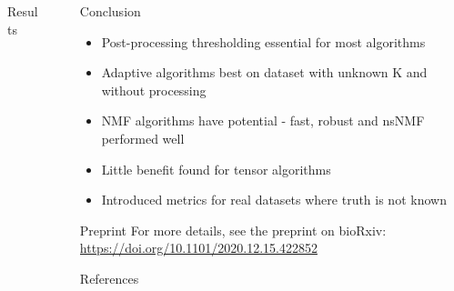 \documentclass[xcolor=table,final]{beamer}
\newlength{\sepwid}
\newlength{\onecolwid}
\begin{document}
\begin{frame}[t]
\begin{columns}[t]
\begin{column}{\onecolwid}
\begin{block}{Results}
\end{block}


\end{column} %

\begin{column}{\sepwid}\end{column} %
\begin{column}{\onecolwid} %


\begin{block}{Conclusion}

\begin{itemize}
    \item Post-processing thresholding essential for most algorithms
    \item Adaptive algorithms best on dataset with unknown K and without processing
    \item NMF algorithms have potential - fast, robust and nsNMF performed well
    \item Little benefit found for tensor algorithms
    \item Introduced metrics for real datasets where truth is not known
\end{itemize}

\end{block}

\begin{alertblock}{Preprint}
For more details, see the preprint on bioRxiv: \\
\small \url{https://doi.org/10.1101/2020.12.15.422852}
\end{alertblock}


\begin{block}{References}

\nocite{*} %
{
}

\end{block}


\end{column}
\end{columns}
\end{frame}
\end{document}
